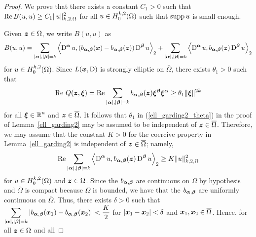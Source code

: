 \begin{proof}
 We prove that there exists a constant $C_1>0$ such that
$\displaystyle \operatorname{Re} B(u,u) \geq C_1 \|u\|_{k,2,\Omega}^2$ for all
$\displaystyle u\in H^{k,2}_0(\Omega)$ such that $\operatorname{supp} u$ is small enough.

Given ${\bm{z}} \in \Omega$, we write $B(u,u)$ as
\begin{equation} \label{ell_garding3_B}
B(u,u) =
\sum_{|{\bm{\alpha}}|,|{\bm{\beta}}|= k}
\left\langle{\operatorname{D}^{{\bm{\alpha}}} u} , {
\left(b_{{\bm{\alpha}},{\bm{\beta}}}({\bm{x}})
-b_{{\bm{\alpha}},{\bm{\beta}}}({\bm{z}})\right)\operatorname{D}^{{\bm{\beta}}} u}\right\rangle_2
+ \sum_{|{\bm{\alpha}}|,|{\bm{\beta}}|= k}
\left\langle{\operatorname{D}^{{\bm{\alpha}}} u} , {b_{{\bm{\alpha}},{\bm{\beta}}}({\bm{z}})
\operatorname{D}^{{\bm{\beta}}} u}\right\rangle_2
\end{equation}
for $\displaystyle u \in H^{k,2}_0(\Omega)$.
Since $L({\bm{x}},\operatorname{D})$ is strongly elliptic on $\overline{\Omega}$,
there exists $\theta_1 >0$ such that
\begin{equation} \label{ell_garding3_theta1}
\operatorname{Re}\, Q({\bm{z}}, {\bm{\xi}}) = \operatorname{Re} \sum_{|{\bm{\alpha}}|,|{\bm{\beta}}|=k}
b_{{\bm{\alpha}},{\bm{\beta}}}({\bm{z}}) {\bm{\xi}}^{{\bm{\beta}}}
{\bm{\xi}}^{{\bm{\alpha}}} \geq \theta_1 \|{\bm{\xi}}\|^{2k}
\end{equation}
for all $\displaystyle {\bm{\xi}} \in \mathbb{R}^n$ and ${\bm{z}}\in \overline{\Omega}$.
It follows that $\theta_1$ in (\ref{ell_garding2_theta}) in
the proof of Lemma~\ref{ell_garding2} may be assumed to be independent of
${\bm{z}} \in \overline{\Omega}$.  Therefore, we may assume that the
constant $K>0$ for the coercive property in Lemma~\ref{ell_garding2}
is independent of ${\bm{z}} \in \overline{\Omega}$; namely,
\begin{equation} \label{ell_garding_local1}
\operatorname{Re} \sum_{|{\bm{\alpha}}|,|{\bm{\beta}}|= k}
\left\langle{\operatorname{D}^{{\bm{\alpha}}} u} , {b_{{\bm{\alpha}},{\bm{\beta}}}({\bm{z}}) \operatorname{D}^{{\bm{\beta}}} u}\right\rangle_2
\geq K \|u\|_{k,2,\Omega}^2
\end{equation}
for $\displaystyle u \in H^{k,2}_0(\Omega)$ and ${\bm{z}} \in \Omega$.
Since the $b_{{\bm{\alpha}},{\bm{\beta}}}$ are continuous on
$\overline{\Omega}$ by hypothesis and $\overline{\Omega}$ is compact
because $\Omega$ is bounded, we have that the
$b_{{\bm{\alpha}},{\bm{\beta}}}$ are uniformly continuous on
$\overline{\Omega}$.  Thus, there exists $\delta >0$ such that
$\displaystyle \sum_{|{\bm{\alpha}}|,|{\bm{\beta}}|= k}
\left|b_{{\bm{\alpha}},{\bm{\beta}}}({\bm{x}}_1)
-b_{{\bm{\alpha}},{\bm{\beta}}}({\bm{x}}_2)\right| < \frac{K}{2}$
for $\displaystyle \left| {\bm{x}}_1- {\bm{x}}_2 \right| < \delta$ and
${\bm{x}}_1, {\bm{x}}_2 \in \overline{\Omega}$.
Hence, for all ${\bm{z}} \in \Omega$ and all

\end{proof}
